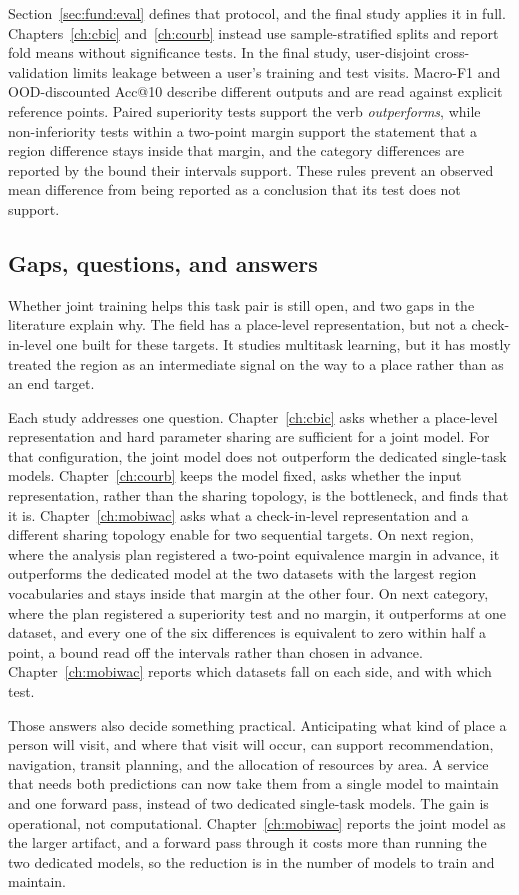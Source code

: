 Section~\ref{sec:fund:eval} defines that protocol, and the final study applies it in
full. Chapters~\ref{ch:cbic} and~\ref{ch:courb} instead use sample-stratified splits
and report fold means without significance tests. In the final study, user-disjoint
cross-validation limits leakage between a user's training and test visits. Macro-F1 and OOD-discounted
Acc@10 describe different outputs and are read against explicit reference points.
Paired superiority tests support the verb \emph{outperforms}, while non-inferiority
tests within a two-point margin support the statement that a region difference stays inside that
margin, and the category differences are reported by the bound their intervals support. These rules prevent an
observed mean difference from being reported as a conclusion that its test does not
support.

\subsection{Gaps, questions, and answers}

Whether joint training helps this task pair is still open, and two gaps in the
literature explain why. The field has a place-level representation, but not a
check-in-level one built for these targets. It studies multitask learning, but it has
mostly treated the region as an intermediate signal on the way to a place rather than
as an end target.

Each study addresses one question. Chapter~\ref{ch:cbic} asks whether a
place-level representation and hard parameter sharing are sufficient for a joint
model. For that configuration, the joint model does not outperform the dedicated
single-task models. Chapter~\ref{ch:courb} keeps the model fixed, asks whether the
input representation, rather than the sharing topology, is the bottleneck, and finds
that it is. Chapter~\ref{ch:mobiwac} asks what a check-in-level representation and a
different sharing topology enable for two sequential targets.
On next region, where the analysis plan registered a
two-point equivalence margin in advance, it outperforms the dedicated model at the two datasets
with the largest region vocabularies and stays inside that margin at the other four. On next
category, where the plan registered a superiority test and no margin, it outperforms at one
dataset, and every one of the six differences is equivalent to zero within half a point, a bound
read off the intervals rather than chosen in advance. Chapter~\ref{ch:mobiwac} reports which datasets fall on each
side, and with which test.

Those answers also decide something practical. Anticipating what kind of place a
person will visit, and where that visit will occur, can support recommendation,
navigation, transit planning, and the allocation of resources by area. A service that
needs both predictions can now take them from a single model to maintain and one
forward pass, instead of two dedicated single-task models. The gain is operational,
not computational. Chapter~\ref{ch:mobiwac} reports the joint model as the larger
artifact, and a forward pass through it costs more than running the two dedicated
models, so the reduction is in the number of models to train and maintain.
